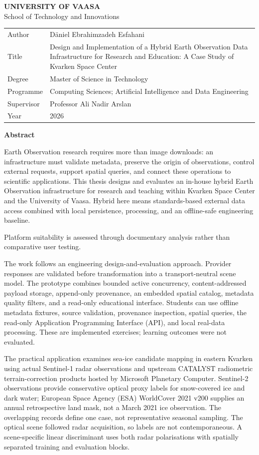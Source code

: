 \begingroup
\singlespacing
\fontsize{11}{12.5}\selectfont
\noindent\textbf{UNIVERSITY OF VAASA}\\
School of Technology and Innovations\\[4pt]
\begin{tabular}{@{}p{}p{}@{}}
Author & Däniel Ebrahimzadeh Esfahani\\
Title & Design and Implementation of a Hybrid Earth Observation Data Infrastructure for Research and Education: A Case Study of Kvarken Space Center\\
Degree & Master of Science in Technology\\
Programme & Computing Sciences; Artificial Intelligence and Data Engineering\\
Supervisor & Professor Ali Nadir Arslan\\
Year & 2026\\
\end{tabular}
\par\medskip\noindent\textbf{Abstract}\par

Earth Observation research requires more than image downloads: an infrastructure must validate
metadata, preserve the origin of observations, control external requests, support spatial
queries, and connect these operations to scientific applications. This thesis designs and
evaluates an in-house hybrid Earth Observation infrastructure for research and teaching within
Kvarken Space Center and the University of Vaasa. Hybrid here means standards-based external
data access combined with local persistence, processing, and an offline-safe engineering
baseline.

Platform suitability is assessed through documentary analysis rather than comparative user testing.

The work follows an engineering design-and-evaluation approach. Provider responses are
validated before transformation into a transport-neutral scene model. The prototype combines
bounded active concurrency, content-addressed payload storage, append-only provenance, an
embedded spatial catalog, metadata quality filters, and a read-only educational interface.
Students can use offline metadata fixtures, source validation, provenance inspection, spatial
queries, the read-only Application Programming Interface (API), and local real-data processing.
These are implemented exercises; learning outcomes were not evaluated.

The practical application examines sea-ice candidate mapping in eastern Kvarken using actual
Sentinel-1 radar observations and upstream CATALYST radiometric terrain-correction products
hosted by Microsoft Planetary Computer. Sentinel-2 observations provide conservative optical
proxy labels for snow-covered ice and dark water; European Space Agency (ESA) WorldCover 2021
v200 supplies an annual retrospective land mask, not a March 2021 ice observation. The
overlapping records define one case, not representative seasonal sampling. The optical scene
followed radar acquisition, so labels are not contemporaneous. A scene-specific linear
discriminant uses both radar polarisations with spatially separated training and evaluation
blocks.

